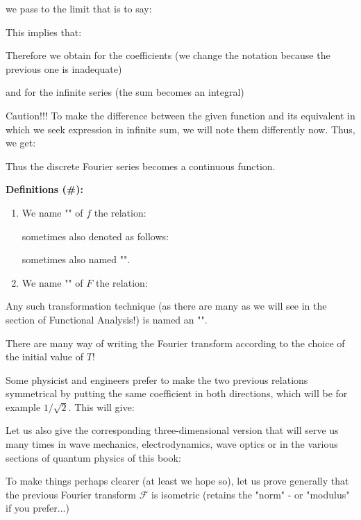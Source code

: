 	we pass to the limit that is to say:
	
	This implies that:
	
	Therefore we obtain for the coefficients (we change the notation because the previous one is inadequate)
	
	and for the infinite series (the sum becomes an integral)
	
	Caution!!! To make the difference between the given function and its equivalent in which we seek expression in infinite sum, we will note them differently now. Thus, we get:
	
	Thus the discrete Fourier series becomes a continuous function.
	
	\textbf{Definitions (\#\mydef):}
	\begin{enumerate}
		\item We name "" of $f$ the relation:
		
		sometimes also denoted as follows:
		
		sometimes also named "".
		
		\item We name "" of $F$ the relation:
		
	\end{enumerate}
	Any such transformation technique (as there are many as we will see in the section of Functional Analysis!) is named an "".
	\begin{tcolorbox}[title=Remark,colframe=black,arc=10pt]
	There are many way of writing the Fourier transform according to the choice of the initial value of $T$!
	\end{tcolorbox}
	Some physicist and engineers prefer to make the two previous relations symmetrical by putting the same coefficient in both directions, which will be for example $1/\sqrt{2}$. This will give:	
	
	Let us also give the corresponding three-dimensional version that will serve us many times in wave mechanics, electrodynamics, wave optics or in the various sections of quantum physics of this book:
	
	To make things perhaps clearer (at least we hope so), let us prove generally that the previous Fourier transform $\mathcal{F}$ is isometric (retains the "norm" - or "modulus" if you prefer...)
	
